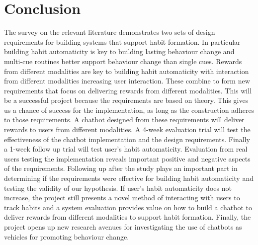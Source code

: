 
\newpage
\section{Conclusion}

The survey on the relevant literature demonstrates two sets of design requirements for building systems that support habit formation. In particular building habit automaticity is key to building lasting behaviour change and multi-cue routines better support behaviour change than single cues. Rewards from different modalities are key to building habit automaticity with interaction from different modalities increasing user interaction. These combine to form new requirements that focus on delivering rewards from different modalities.\newline
\newline
This will be a successful project because the requirements are based on theory. This gives us a chance of success for the implementation, as long as the construction adheres to those requirements.\newline
\newline
A chatbot designed from these requirements will deliver rewards to users from different modalities. A 4-week evaluation trial will test the effectiveness of the chatbot implementation and the design requirements. Finally a 1-week follow up trial will test user's habit automaticity.\newline
\newline
Evaluation from real users testing the implementation reveals important positive and negative aspects of the requirements. Following up after the study plays an important part in determining if the requirements were effective for building habit automaticity and testing the validity of our hypothesis. If user's habit automaticity does not increase, the project still presents a novel method of interacting with users to track habits and a system evaluation provides value on how to build a chatbot to deliver rewards from different modalities to support habit formation. Finally, the project opens up new research avenues for investigating the use of chatbots as vehicles for promoting behaviour change.
